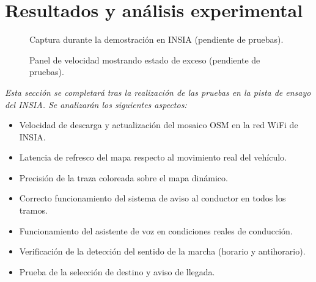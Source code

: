 \documentclass[10pt]{article}
\begin{document}
\section{Resultados y análisis experimental}

\begin{figure}[H]
    \centering
    \caption{Captura durante la demostración en INSIA (pendiente de pruebas).}
    \label{fig:captura_insia}
\end{figure}

\begin{figure}[H]
    \centering
    \caption{Panel de velocidad mostrando estado de exceso (pendiente de pruebas).}
    \label{fig:captura_exceso}
\end{figure}

\textit{Esta sección se completará tras la realización de las pruebas en la pista de ensayo del INSIA. Se analizarán los siguientes aspectos:}

\begin{itemize}[leftmargin=1.2em]
    \item Velocidad de descarga y actualización del mosaico OSM en la red WiFi de INSIA.
    \item Latencia de refresco del mapa respecto al movimiento real del vehículo.
    \item Precisión de la traza coloreada sobre el mapa dinámico.
    \item Correcto funcionamiento del sistema de aviso al conductor en todos los tramos.
    \item Funcionamiento del asistente de voz en condiciones reales de conducción.
    \item Verificación de la detección del sentido de la marcha (horario y antihorario).
    \item Prueba de la selección de destino y aviso de llegada.
\end{itemize}
\end{document}
